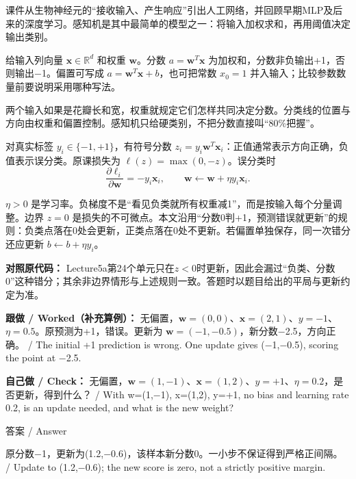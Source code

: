 课件从生物神经元的“接收输入、产生响应”引出人工网络，并回顾早期MLP及后来的深度学习。感知机是其中最简单的模型之一：将输入加权求和，再用阈值决定输出类别。


给输入列向量 \(\mathbf{x}\in\mathbb R^d\) 和权重 \(\mathbf w\)。分数 \(a=\mathbf w^T\mathbf x\) 为加权和，分数非负输出+1，否则输出\ensuremath{-}1。偏置可写成 \(a=\mathbf w^T\mathbf x+b\)，也可把常数 \(x_0=1\) 并入输入；比较参数数量前要说明采用哪种写法。


两个输入如果是花瓣长和宽，权重就规定它们怎样共同决定分数。分类线的位置与方向由权重和偏置控制。感知机只给硬类别，不把分数直接叫“80\%把握”。


对真实标签 \(y_i\in\{-1,+1\}\)，有符号分数 \(z_i=y_i\mathbf w^T\mathbf x_i\)：正值通常表示方向正确，负值表示误分类。原课损失为 \(\ell(z)=\max(0,-z)\)。误分类时
\[
\frac{\partial\ell_i}{\partial\mathbf w}=-y_i\mathbf x_i,\qquad
\mathbf w\leftarrow\mathbf w+\eta y_i\mathbf x_i.\tag{5.1}
\]


\(\eta>0\) 是学习率。负梯度不是“看见负类就所有权重减1”，而是按输入每个分量调整。边界 \(z=0\) 是损失的不可微点。本文沿用“分数0判+1，预测错误就更新”的规则：负类点落在0处会更新，正类点落在0处不更新。若偏置单独保存，同一次错分还应更新 \(b\leftarrow b+\eta y_i\)。


\textbf{对照原代码：} Lecture5a第24个单元只在\(z<0\)时更新，因此会漏过“负类、分数0”这种错分；其余非边界情形与上述规则一致。答题时以题目给出的平局与更新约定为准。


\textbf{跟做 / Worked（补充算例）：} 无偏置，\(\mathbf w=(0,0)\)、\(\mathbf x=(2,1)\)、\(y=-1\)、\(\eta=0.5\)。原预测为+1，错误。更新为 \(\mathbf w=(-1,-0.5)\)，新分数\ensuremath{-}2.5，方向正确。 / The initial +1 prediction is wrong. One update gives (\ensuremath{-}1,\ensuremath{-}0.5), scoring the point at \ensuremath{-}2.5.


\textbf{自己做 / Check：} 无偏置，\(\mathbf w=(1,-1)\)、\(\mathbf x=(1,2)\)、\(y=+1\)、\(\eta=0.2\)，是否更新，得到什么？ / With w=(1,\ensuremath{-}1), x=(1,2), y=+1, no bias and learning rate 0.2, is an update needed, and what is the new weight?



\begin{StudySolution}{答案 / Answer}


原分数\ensuremath{-}1，更新为(1.2,\ensuremath{-}0.6)，该样本新分数0。一小步不保证得到严格正间隔。 / Update to (1.2,\ensuremath{-}0.6); the new score is zero, not a strictly positive margin.


\end{StudySolution}


